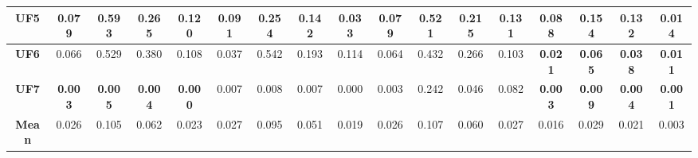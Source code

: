 \begin{table*}[t]
\begin{scriptsize}
\begin{tabular}{cc|c|c|c|c|c|c|c|c|c|c|c|c|c|c|c}
\multicolumn{1}{c|}{\textbf{UF5}}   & 0.079          & 0.593          & 0.265          & 0.120          & \textbf{0.091} & \textbf{0.254} & \textbf{0.142} & \textbf{0.033} & 0.079          & 0.521          & 0.215          & 0.131          & \textbf{0.088} & \textbf{0.154} & \textbf{0.132} & \textbf{0.014} \\ \hline
\multicolumn{1}{c|}{\textbf{UF6}}   & 0.066          & 0.529          & 0.380          & 0.108          & 0.037          & 0.542          & 0.193          & 0.114          & 0.064          & 0.432          & 0.266          & 0.103          & \textbf{0.021} & \textbf{0.065} & \textbf{0.038} & \textbf{0.011} \\ \hline
\multicolumn{1}{c|}{\textbf{UF7}}   & \textbf{0.003} & \textbf{0.005} & \textbf{0.004} & \textbf{0.000} & 0.007          & 0.008          & 0.007          & 0.000          & 0.003          & 0.242          & 0.046          & 0.082          & \textbf{0.003} & \textbf{0.009} & \textbf{0.004} & \textbf{0.001} \\ \hline
\multicolumn{1}{c|}{\textbf{Mean}}  & 0.026          & 0.105          & 0.062          & 0.023          & 0.027          & 0.095          & 0.051          & 0.019          & 0.026          & 0.107          & 0.060          & 0.027          & 0.016          & 0.029          & 0.021          & 0.003          \\ \hline
\end{tabular}%
\end{scriptsize}
\end{table*}


